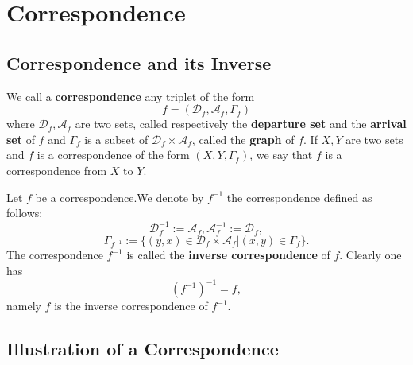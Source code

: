 \chapter{Correspondence}
\section{Correspondence and its Inverse}
\begin{definitionenv}
    We call a \textbf{correspondence} any triplet of the form $$f=(\mathscr{D} _f, \mathscr{A}_f, \Gamma_f)$$
    where $\mathscr{D}_f, \mathscr{A}_f$ are two sets,  called respectively the \textbf{departure set }  and the \textbf{arrival set} of $f$ and $\Gamma_f$ is a subset of $\mathscr{D}_f\times \mathscr{A}_f$,  called the \textbf{graph} of $f$.
    \newline
    If $X, Y$ are two sets and $f$ is a correspondence of the form $(X, Y, \Gamma_f)$, we say that $f$ is a correspondence from $X$ to $Y$. 
\end{definitionenv}
\begin{definitionenv}
    Let $f$ be a correspondence.We denote by $f^{-1}$ the correspondence defined as follows:
    $$\mathscr{D}_f^{-1}:=\mathscr{A}_f, \mathscr{A}_f^{-1}:=\mathscr{D}_f, $$
    $$\Gamma_{f^{-1}}:=\{(y, x)\in \mathscr{D}_f\times \mathscr{A}_f|(x, y)\in \Gamma_f\}.$$
    The correspondence $f^{-1}$ is called the \textbf{inverse correspondence} of $f$. Clearly one has $$(f^{-1})^{-1}=f, $$
    namely $f$ is the inverse correspondence of $f^{-1}$.
\end{definitionenv}
\section{Illustration of a Correspondence}
